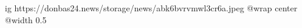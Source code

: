  
 
 
 
 

\ifcmt
  ig https://donbas24.news/storage/news/abk6bvrvmwl3cr6a.jpeg
  @wrap center
  @width 0.5
\fi
